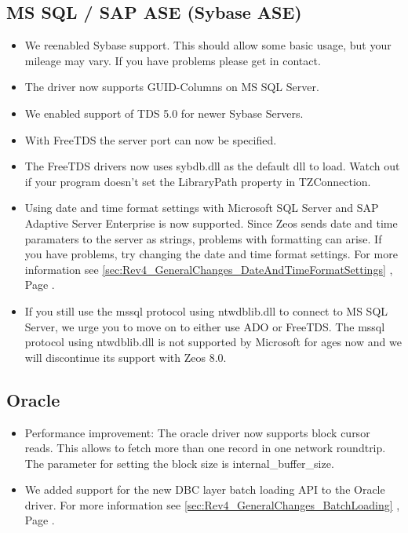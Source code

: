 \documentclass[a4paper,12pt,oneside]{book}
\begin{document}
\subsection{MS SQL / SAP ASE (Sybase ASE)}
\label{sec:Rev4_DriverSpecificChanges_MssqlAse}
\begin{itemize}
\item 
  We reenabled Sybase support.
	This should allow some basic usage, but your mileage may vary.
	If you have problems please get in contact.
\item 
  The driver now supports GUID-Columns on MS SQL Server.
\item 
  We enabled support of TDS 5.0 for newer Sybase Servers.
\item 
  With FreeTDS the server port can now be specified.
\item 
  The FreeTDS drivers now uses sybdb.dll as the default dll to load.
	Watch out if your program doesn't set the LibraryPath property in TZConnection.
\item
  Using date and time format settings with Microsoft SQL Server and SAP Adaptive Server Enterprise is now supported.
  Since Zeos sends date and time paramaters to the server as strings, problems with formatting can arise.
	If you have problems, try changing the date and time format settings.
	For more information see \ref{sec:Rev4_GeneralChanges_DateAndTimeFormatSettings} , Page \pageref{sec:Rev4_GeneralChanges_DateAndTimeFormatSettings}.
\item 
  If you still use the mssql protocol using ntwdblib.dll to connect to MS SQL Server, we urge you to move on to either use ADO or FreeTDS.
	The mssql protocol using ntwdblib.dll is not supported by Microsoft for ages now and we will discontinue its support with Zeos 8.0.
\end{itemize}

\subsection{Oracle}
\label{sec:Rev4_DriverSpecificChanges_Oracle}
\begin{itemize}
\item
  Performance improvement: The oracle driver now supports block cursor reads.
	This allows to fetch more than one record in one network roundtrip.
	The parameter for setting the block size is internal\_buffer\_size.
\item
  We added support for the new DBC layer batch loading API to the Oracle driver.
	For more information see \ref{sec:Rev4_GeneralChanges_BatchLoading} , Page \pageref{sec:Rev4_GeneralChanges_BatchLoading}.
\end{itemize}
\end{document}
